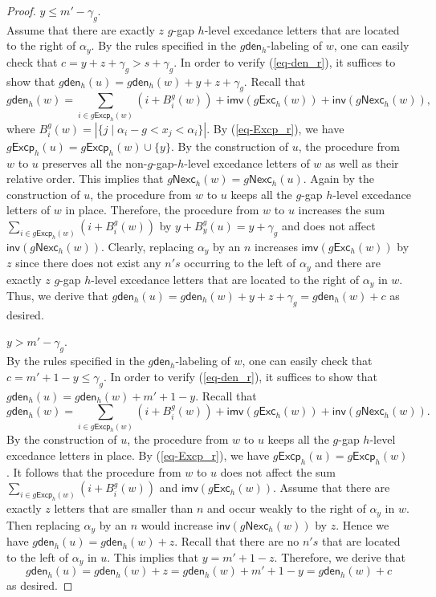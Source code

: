 \documentclass[12pt]{article}
\numberwithin{equation}{section}
\theoremstyle{plain}
\def\den{\mathsf{den}}
\def\Exc{\mathsf{Exc}}
\def\Nexc{\mathsf{Nexc}}
\def\Excp{\mathsf{Excp}}
\def\inv{\mathsf{inv}}
\def\imv{\mathsf{imv}}
\begin{document}
\begin{proof}
 $y\leq  m'-\gamma_g$.\\
 Assume that there are exactly  $z$ $g$-gap $h$-level excedance letters that are located to the right of $\alpha_y$. 
By the rules   specified in the $g\den_h$-labeling of $w$,  one can easily check that $c=y+z+\gamma_g>s+\gamma_g$. In order to verify (\ref{eq-den_r}), it suffices to show that $g\den_h(u)=g\den_h(w)+y+z+\gamma_g$. 
Recall that 
$$
g\den_h(w)=\sum\limits_{i\in g\Excp_h(w)} (i+B^g_i(w)) +{\imv}(g\Exc_h(w))+{\inv}(g\Nexc_h (w)),
$$
	where $B^{g}_i(w)=|\{j \mid \alpha_i -g< x_j < \alpha_i\}|$. 
By (\ref{eq-Excp_r}), we have $g\Excp_h(u)=g\Excp_h(w)\cup \{y\}$.  By the construction of $u$, the procedure from $w$ to $u$ preserves all the non-$g$-gap-$h$-level excedance letters of $w$ as well as their relative order.  This implies that $g\Nexc_h(w)=g\Nexc_h(u)$.    Again by the construction of $u$, the procedure from $w$ to $u$ keeps all the $g$-gap $h$-level excedance letters of $w$ in place. 
Therefore, the procedure from $w$ to $u$  increases the sum 
$ 
\sum\limits_{i\in g\Excp_h(w)} (i+B^g_i(w))
$ by $y+B^g_y(u)=y+\gamma_g$ and does not affect ${\inv}(g\Nexc_h (w))$. Clearly, replacing $\alpha_y$ by an $n$ increases ${\imv}(g\Exc_h(w))$  by $z$ since there does not exist any $n's$ occurring to the left of $\alpha_y$ and there are exactly $z$ $g$-gap $h$-level excedance letters that are located to the right of $\alpha_y$ in $w$. Thus, we derive that $g\den_h(u)=g\den_h(w)+y+z+\gamma_g=g\den_h(w)+c$ as desired. 


 $y>  m'-\gamma_g$.\\
By the rules   specified in the $g\den_h$-labeling of $w$,  one can easily check that $c=m'+1-y\leq \gamma_g$. In order to verify (\ref{eq-den_r}), it suffices to show that $g\den_h(u)=g\den_h(w)+m'+1-y$. 
Recall that 
$$
g\den_h(w)=\sum\limits_{i\in g\Excp_h(w)} (i+B^g_i(w)) +{\imv}(g\Exc_h(w))+{\inv}(g\Nexc_h (w)).
$$
   By the construction of $u$, the procedure from $w$ to $u$ keeps all the $g$-gap $h$-level excedance letters in place.  By (\ref{eq-Excp_r}), we have $g\Excp_h(u)=g\Excp_h(w)$.  It follows that   the procedure from $w$ to $u$ does not affect the sum $\sum\limits_{i\in g\Excp_h(w)} (i+B^g_i(w))$ and $\imv(g\Exc_h(w))$.  
   Assume that there are exactly $z$ letters that are smaller than $n$  and   occur weakly to the  right of $\alpha_y$ in $w$. Then   replacing $\alpha_y$ by an $n$  would increase  ${\inv}(g\Nexc_h(w))$  by $z$. 
   Hence we have $g\den_h(u)=g\den_h(w)+z$. Recall that there are no $n's$ that are located  to the left of $\alpha_y$ in $u$. This implies that $y=m'+1-z$. Therefore, we derive that
   $$
   g\den_h(u)=g\den_h(w)+z=g\den_h(w)+m'+1-y=g\den_h(w)+c
   $$
   as desired.  
   

\end{proof}
\end{document}
